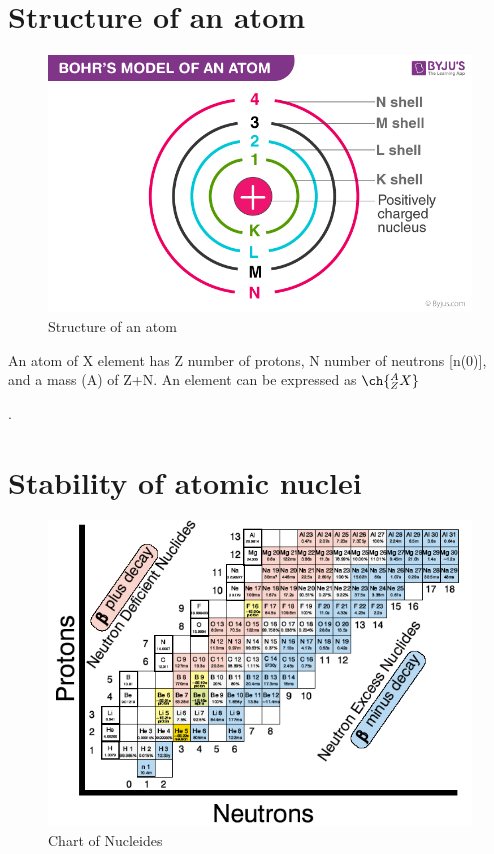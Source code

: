 \section{Structure of an atom}
\begin{figure}
    \centering
    \includegraphics[width=0.75\linewidth]{atom.png}
    \caption{Structure of an atom}
\end{figure}
An atom of X element has Z number of protons, N number of neutrons [n(0)], and a mass (A) of Z+N. An element can be expressed as $\ch{^{A}_{Z}X}$ \par.
\section{Stability of atomic nuclei}
\begin{figure}
    \centering
    \includegraphics[width=0.75\linewidth]{chart_of_nucleides.png}
    \caption{Chart of Nucleides}
\end{figure}
